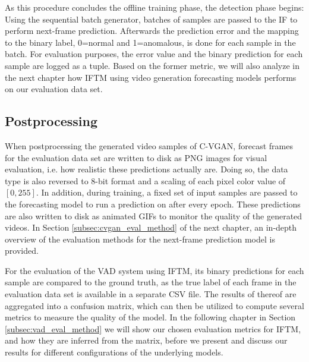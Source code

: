 As this procedure concludes the offline training phase, the detection phase begins: Using the sequential batch generator, batches of samples are passed to the IF to perform next-frame prediction. Afterwards the prediction error and the mapping to the binary label, 0=normal and 1=anomalous, is done for each sample in the batch. For evaluation purposes, the error value and the binary prediction for each sample are logged as a tuple. Based on the former metric, we will also analyze in the next chapter how IFTM using video generation forecasting models performs on our evaluation data set.


\subsection{Postprocessing} \label{subsec:postprocessing}

When postprocessing the generated video samples of C-VGAN, forecast frames for the evaluation data set are written to disk as PNG images for visual evaluation, i.e. how realistic these predictions actually are. Doing so, the data type is also reversed to 8-bit format and a scaling of each pixel color value of $[0,255]$. In addition, during training, a fixed set of input samples are passed to the forecasting model to run a prediction on after every epoch. These predictions are also written to disk as animated GIFs to monitor the quality of the generated videos. In Section \ref{subsec:cvgan_eval_method} of the next chapter, an in-depth overview of the evaluation methods for the next-frame prediction model is provided.

For the evaluation of the VAD system using IFTM, its binary predictions for each sample are compared to the ground truth, as the true label of each frame in the evaluation data set is available in a separate CSV file. The results of thereof are aggregated into a confusion matrix, which can then be utilized to compute several metrics to measure the quality of the model. In the following chapter in Section \ref{subsec:vad_eval_method} we will show our chosen evaluation metrics for IFTM, and how they are inferred from the matrix, before we present and discuss our results for different configurations of the underlying models. 